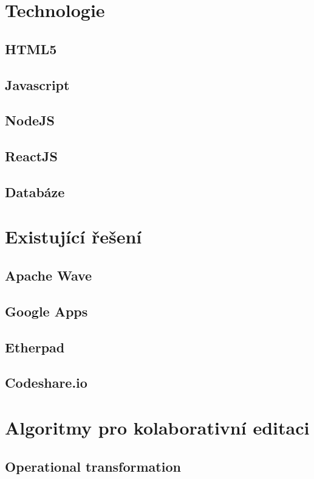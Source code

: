 
\section{Technologie}
\subsection{HTML5}
\subsection{Javascript}
\subsection{NodeJS}
\subsection{ReactJS}
\subsection{Databáze}

\section{Existující řešení}
\subsection{Apache Wave}
\subsection{Google Apps}
\subsection{Etherpad}
\subsection{Codeshare.io}

\section{Algoritmy pro kolaborativní editaci}
\subsection{Operational transformation}
